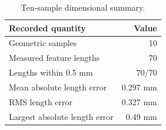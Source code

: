 \begin{table}[H]\centering\small
\begin{tabular}{lr}
\toprule Recorded quantity & Value\\\midrule
Geometric samples & 10\\
Measured feature lengths & 70\\
Lengths within 0.5 mm & 70/70\\
Mean absolute length error & 0.297 mm\\
RMS length error & 0.327 mm\\
Largest absolute length error & 0.49 mm\\
\bottomrule\end{tabular}
\caption{Ten-sample dimensional summary.}\label{tab:res-gantry-summary}\end{table}
